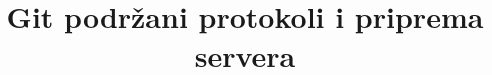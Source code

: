 \documentclass[10pt]{beamer}
\title{Git podržani protokoli i priprema servera}
\begin{document}
	\begin{frame}
		\maketitle	

	\end{frame}

	
\end{document}
